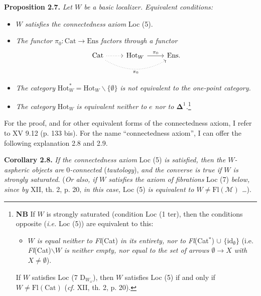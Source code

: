 \documentclass[11pt]{article}
\newcommand{\printedpage}[1]{\marginpar{\footnotesize p.~#1}}
\newcommand{\msp}[1]{\marginpar{\footnotesize [#1]}}
\begin{document}
\textbf{Proposition 2.7.} \textit{Let $W$ be a basic localizer. Equivalent conditions:}
\begin{itemize}[leftmargin=3em]
\item[a)] $W$ \textit{satisfies the connectedness axiom} Loc (5).
\item[b)] \textit{The functor} $\pi_0 : \mathrm{Cat} \longrightarrow \mathrm{Ens}$ \textit{factors through a functor}
\printedpage{7}
\[
\begin{tikzcd}
\mathrm{Cat} \arrow[r, dotted] \arrow[rr, dotted, bend right, "\pi_0"'] & \mathrm{Hot}_W \arrow[r, "\pi_0"] & \mathrm{Ens}.
\end{tikzcd}
\]
\item[c)] \textit{The category} $\mathrm{Hot}^*_W = \mathrm{Hot}_W\backslash\{\emptyset\}$ \textit{is not equivalent to the one-point category.}
\item[c$'$)] \textit{The category} $\mathrm{Hot}_W$ \textit{is equivalent neither to $e$ nor to $\boldsymbol{\Delta}^1$.}\footnote{\textbf{NB} If $W$ is strongly saturated (condition Loc (1 ter), then the conditions opposite (\textit{i.e.} Loc (5)) are equivalent to this: %
\begin{itemize}[leftmargin=2.5em]
\item[d)] \textit{$W$ is equal neither to Fl}(Cat) \textit{in its entirety, nor to Fl}(Cat$^*$) $\cup$ $\{\mathrm{id}_\emptyset\}$ (i.e. \textit{Fl}(Cat)$\backslash W$ \textit{is neither empty, nor equal to the set of arrows $\emptyset \longrightarrow X$ with $X \neq \emptyset$}).
\end{itemize}
If $W$ satisfies Loc (7 D$_{W_\omega}$), then $W$ satisfies Loc (5) if and only if $W \neq \mathrm{Fl}(\mathrm{Cat})$ (\textit{cf.} XII, th. 2, p. 20).}
\end{itemize}

For the proof, and for other equivalent forms of the connectedness axiom, \msp{page 13}I refer to XV 9.12 (p. 133 bis). For the name ``connectedness axiom'', I can offer the following explanation 2.8 and 2.9.

\textbf{Corollary 2.8.} \textit{If the connectedness axiom} Loc (5) \textit{is satisfied, then the $W$-aspheric objects are} 0\textit{-connected} (\textit{tautology}), \textit{and the converse is true if $W$ is strongly saturated.} (\textit{Or also, if $W$ satisfies the axiom of fibrations} Loc (7) \textit{below, since by} XII, th. 2, p. 20, \textit{in this case,} Loc (5) \textit{is equivalent to $W \neq \mathrm{Fl}(\mathcal{M})$ \ldots}).
\end{document}
